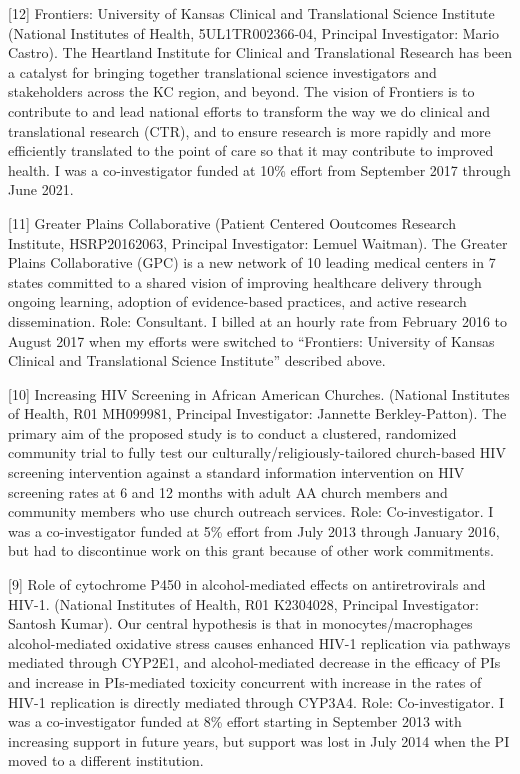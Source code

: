 \documentclass[
  12pt,
]{article}
\begin{document}
{[}12{]} Frontiers: University of Kansas Clinical and Translational
Science Institute (National Institutes of Health, 5UL1TR002366-04,
Principal Investigator: Mario Castro). The Heartland Institute for
Clinical and Translational Research has been a catalyst for bringing
together translational science investigators and stakeholders across the
KC region, and beyond. The vision of Frontiers is to contribute to and
lead national efforts to transform the way we do clinical and
translational research (CTR), and to ensure research is more rapidly and
more efficiently translated to the point of care so that it may
contribute to improved health. I was a co-investigator funded at 10\%
effort from September 2017 through June 2021.

{[}11{]} Greater Plains Collaborative (Patient Centered Ooutcomes
Research Institute, HSRP20162063, Principal Investigator: Lemuel
Waitman). The Greater Plains Collaborative (GPC) is a new network of 10
leading medical centers in 7 states committed to a shared vision of
improving healthcare delivery through ongoing learning, adoption of
evidence-based practices, and active research dissemination. Role:
Consultant. I billed at an hourly rate from February 2016 to August 2017
when my efforts were switched to ``Frontiers: University of Kansas
Clinical and Translational Science Institute'' described above.

{[}10{]} Increasing HIV Screening in African American Churches.
(National Institutes of Health, R01 MH099981, Principal Investigator:
Jannette Berkley-Patton). The primary aim of the proposed study is to
conduct a clustered, randomized community trial to fully test our
culturally/religiously-tailored church-based HIV screening intervention
against a standard information intervention on HIV screening rates at 6
and 12 months with adult AA church members and community members who use
church outreach services. Role: Co-investigator. I was a co-investigator
funded at 5\% effort from July 2013 through January 2016, but had to
discontinue work on this grant because of other work commitments.

{[}9{]} Role of cytochrome P450 in alcohol-mediated effects on
antiretrovirals and HIV-1. (National Institutes of Health, R01 K2304028,
Principal Investigator: Santosh Kumar). Our central hypothesis is that
in monocytes/macrophages alcohol-mediated oxidative stress causes
enhanced HIV-1 replication via pathways mediated through CYP2E1, and
alcohol-mediated decrease in the efficacy of PIs and increase in
PIs-mediated toxicity concurrent with increase in the rates of HIV-1
replication is directly mediated through CYP3A4. Role: Co-investigator.
I was a co-investigator funded at 8\% effort starting in September 2013
with increasing support in future years, but support was lost in July
2014 when the PI moved to a different institution.
\end{document}
